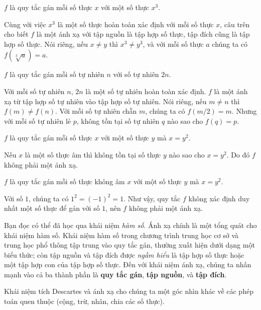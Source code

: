 \begin{example}
    $f$ là quy tắc gán mỗi số thực $x$ với một số thực $x^{3}$.

    \noindent Cùng với việc $x^{3}$ là một số thực hoàn toàn xác định với mỗi số thực $x$, câu trên cho biết $f$ là một ánh xạ với tập nguồn là tập hợp số thực, tập đích cũng là tập hợp số thực. Nói riêng, nếu $x\ne y$ thì $x^{3}\ne y^{3}$, và với mỗi số thực $a$ chúng ta có $f(\sqrt[3]{a}) = a$.
\end{example}

\begin{example}
    $f$ là quy tắc gán mỗi số tự nhiên $n$ với số tự nhiên $2n$.

    \noindent Với mỗi số tự nhiên $n$, $2n$ là một số tự nhiên hoàn toàn xác định. $f$ là một ánh xạ từ tập hợp số tự nhiên vào tập hợp số tự nhiên. Nói riêng, nếu $m\ne n$ thì $f(m)\ne f(n)$. Với mỗi số tự nhiên chẵn $m$, chúng ta có $f(m/2) = m$. Nhưng với mỗi số tự nhiên lẻ $p$, không tồn tại số tự nhiên $q$ nào sao cho $f(q) = p$.
\end{example}

\begin{counterexample}
    $f$ là quy tắc gán mỗi số thực $x$ với một số thực $y$ mà $x = y^{2}$.

    \noindent Nếu $x$ là một số thực âm thì không tồn tại số thực $y$ nào sao cho $x = y^{2}$. Do đó $f$ không phải một ánh xạ.
\end{counterexample}

\begin{counterexample}
    $f$ là quy tắc gán mỗi số thực không âm $x$ với một số thực $y$ mà $x = y^{2}$.

    \noindent Với số $1$, chúng ta có $1^{2} = {(-1)}^{2} = 1$. Như vậy, quy tắc $f$ không xác định duy nhất một số thực để gán với số $1$, nên $f$ không phải một ánh xạ.
\end{counterexample}

Bạn đọc có thể đã học qua khái niệm \textit{hàm số}. Ánh xạ chính là một tổng quát cho khái niệm hàm số. Khái niệm hàm số trong chương trình trung học cơ sở và trung học phổ thông tập trung vào quy tắc gán, thường xuất hiện dưới dạng một biểu thức; còn tập nguồn và tập đích được \textit{ngầm hiểu} là tập hợp số thực hoặc một tập hợp con của tập hợp số thực. Đến với khái niệm ánh xạ, chúng ta nhấn mạnh vào cả ba thành phần là \textbf{quy tắc gán}, \textbf{tập nguồn}, và \textbf{tập đích}.

Khái niệm tích Descartes và ánh xạ cho chúng ta một góc nhìn khác về các phép toán quen thuộc (cộng, trừ, nhân, chia các số thực).

